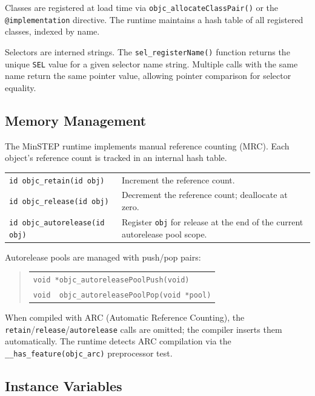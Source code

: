 \documentclass[11pt,twoside]{article}
\begin{document}
Classes are registered at load time via
{\tt objc\_allocateClassPair()} or the {\tt @implementation} directive.
The runtime maintains a hash table of all registered classes, indexed by
name.

Selectors are interned strings.  The {\tt sel\_registerName()} function
returns the unique {\tt SEL} value for a given selector name string.
Multiple calls with the same name return the same pointer value, allowing
pointer comparison for selector equality.

\subsection{Memory Management}

The MinSTEP runtime implements manual reference counting (MRC).  Each
object's reference count is tracked in an internal hash table.

\medskip
\noindent
\begin{tabularx}{\textwidth}{lX}
{\tt id objc\_retain(id obj)}
  & Increment the reference count. \\[4pt]
{\tt id objc\_release(id obj)}
  & Decrement the reference count; deallocate at zero. \\[4pt]
{\tt id objc\_autorelease(id obj)}
  & Register {\tt obj} for release at the end of the current autorelease
    pool scope. \\
\end{tabularx}

Autorelease pools are managed with push/pop pairs:
\begin{quote}
\begin{tabular}{l}
{\tt void *objc\_autoreleasePoolPush(void)}\\
{\tt void\ \ objc\_autoreleasePoolPop(void *pool)}
\end{tabular}
\end{quote}

When compiled with ARC (Automatic Reference Counting), the
{\tt retain}/{\tt release}/{\tt autorelease} calls are omitted; the
compiler inserts them automatically.  The runtime detects ARC
compilation via the {\tt \_\_has\_feature(objc\_arc)} preprocessor test.

\subsection{Instance Variables}
\end{document}
